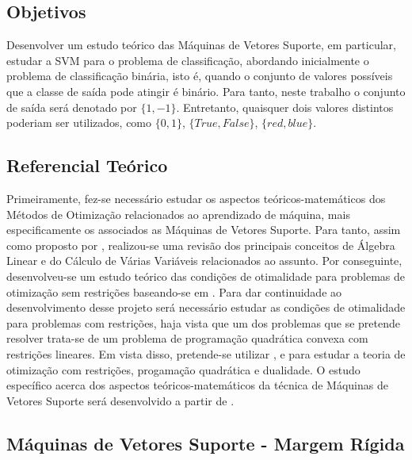 \documentclass[12pt,a4paper]{scrartcl}
\theoremstyle{definition}%
\begin{document}
\subsection{Objetivos}

Desenvolver um estudo teórico das Máquinas de Vetores Suporte, em particular, estudar a SVM para o problema de classificação, abordando inicialmente o problema de classificação binária, isto é, quando o conjunto de valores possíveis que a classe de saída pode atingir é binário. Para tanto, neste trabalho o conjunto de saída será denotado por $\{1,-1\}$. Entretanto, quaisquer dois valores distintos poderiam ser utilizados, como $\{0,1\}$, $\{True, False\}$, $\{red, blue\}$.  



\subsection{Referencial Teórico}
Primeiramente, fez-se necessário estudar os aspectos teóricos-matemáticos dos Métodos de Otimização relacionados ao aprendizado de máquina, mais especificamente os associados as Máquinas de Vetores Suporte. Para tanto, assim como proposto por \textcite{Faisal2019}, realizou-se uma revisão dos principais conceitos de Álgebra Linear e do Cálculo de Várias Variáveis relacionados ao assunto. Por conseguinte, desenvolveu-se um estudo teórico das condições de otimalidade para problemas de otimização sem restrições baseando-se em \textcite{Ademir2013}. Para dar continuidade ao desenvolvimento desse projeto será necessário estudar as condições de otimalidade para problemas com restrições, haja vista que um dos problemas que se pretende resolver trata-se de um problema de programação quadrática convexa com restrições lineares. Em vista disso, pretende-se utilizar \textcite{Ana1994}, \textcite{Solodov2014} e \textcite{Izmailov2014} para estudar a teoria de otimização com restrições, progamação quadrática e dualidade. O estudo específico acerca dos aspectos teóricos-matemáticos da técnica de Máquinas de Vetores Suporte será desenvolvido a partir de \textcite{Evelin2017}.


\subsection{Máquinas de Vetores Suporte - Margem Rígida}
 
\end{document}
